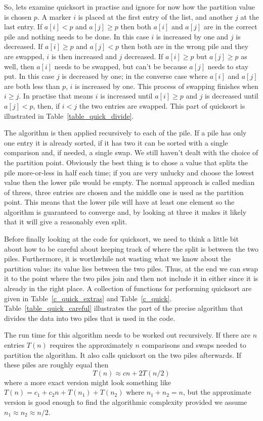 \documentclass[11pt,a4paper]{scrartcl}
\begin{document}
So, lets examine quicksort in practise and ignore for now how the
partition value is chosen $p$. A marker $i$ is placed at the first
entry of the list, and another $j$ at the last entry. If $a[i]<p$ and
$a[j]\ge p$ then both $a[i]$ and $a[j]$ are in the correct pile and
nothing needs to be done. In this case $i$ is increased by one and $j$
is decreased. If $a[i]\ge p$ and $a[j]<p$ then both are in the wrong
pile and they are swapped, $i$ is then increased and $j$ decreased. If
$a[i]\ge p$ but $a[j]\ge p$ as well, then $a[i]$ needs to be swapped,
but can't be because $a[j]$ needs to stay put. In this case $j$ is
decreased by one; in the converse case where $a[i]$ and $a[j]$ are
both less than $p$, $i$ is increased by one. This process of swapping
finishes when $i\ge j$. In practise that means $i$ is increased until
$a[i]\ge p$ and $j$ is decreased until $a[j]<p$, then, if $i<j$ the
two entries are swapped. This part of quicksort is illustrated in
Table~\ref{table_quick_divide}.

The algorithm is then applied recursively to each of the pile. If a
pile has only one entry it is already sorted, if it has two it can be
sorted with a single comparison and, if needed, a single swap. We still
haven't dealt with the choice of the partition point. Obviously the
best thing is to chose a value that splits the pile more-or-less in
half each time; if you are very unlucky and choose the lowest value
then the lower pile would be empty. The normal approach is called
median of threes, three entries are chosen and the middle one is used
as the partition point. This means that the lower pile will have at
least one element so the algorithm is guaranteed to converge and, by
looking at three it makes it likely that it will give a reasonably
even split.

Before finally looking at the code for quicksort, we need to think a
little bit about how to be careful about keeping track of where the split
is between the two piles. Furthermore, it is worthwhile not wasting what
we know about the partition value: its value lies between the two
piles. Thus, at the end we can swap it to the point where the two
piles join and then not include it in either since it is already in
the right place. A collection of functions for performing quicksort
are given in Table~\ref{c_quick_extras} and
Table~\ref{c_quick}. Table~\ref{table_quick_careful} illustrates
the part of the precise algorithm that divides the data into two piles
that is used in the code.

The run time for this algorithm needs to be worked out recursively. If
there are $n$ entries $T(n)$ requires the approximately $n$
comparisons and swaps needed to partition the algorithm. It also calls
quicksort on the two piles afterwards. If these piles are roughly
equal then
\begin{equation}
T(n)\approx cn+2T(n/2)
\end{equation}
where a more exact version might look something like $T(n)=c_1+c_2n +
T(n_1)+T(n_2)$ where $n_1+n_2=n$, but the approximate version is good
enough to find the algorithmic complexity provided we assume
$n_1\approx n_2\approx n/2$. 
\end{document}
